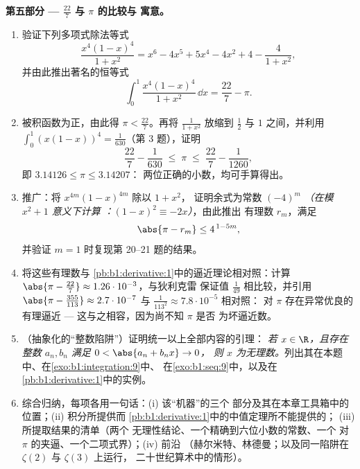 \begin{problem}
\medskip
\noindent\textbf{第五部分 --- $\frac{22}{7}$ 与 $\pi$ 的比较与
寓意。}
\begin{enumerate}[resume]
  \item 验证下列多项式除法等式
        \[
        \frac{x^4(1-x)^4}{1 + x^2}
        = x^6 - 4x^5 + 5x^4 - 4x^2 + 4 - \frac{4}{1 + x^2},
        \]
        并由此推出著名的恒等式
        \[
        \int_0^1 \frac{x^4 (1-x)^4}{1 + x^2}\,\dd x
        = \frac{22}{7} - \pi .
        \]
  \item 被积函数为正，由此得 $\pi <
        \frac{22}{7}$。再将 $\frac{1}{1+x^2}$ 放缩到
        $\frac12$ 与 $1$ 之间，并利用 $\int_0^1 (x(1-x))^4 =
        \frac{1}{630}$（第 3 题），证明
        \[
        \frac{22}{7} - \frac{1}{630} \;\leq\; \pi \;\leq\;
        \frac{22}{7} - \frac{1}{1260} ,
        \]
        即 $3.14126 \leq \pi \leq 3.14207$：
        两位正确的小数，均可手算得出。
  \item 推广：将 $x^{4m}(1-x)^{4m}$ 除以 $1 + x^2$，
        证明余式为常数 $(-4)^m$ \emph{（在模 $x^2 + 1$ 意义下计算
        ：$(1-x)^2 \equiv -2x$）}，由此推出
        有理数 $r_m$，满足
        \[
        \abs{\pi - r_m} \leq 4^{\,1 - 5m} ,
        \]
        并验证 $m = 1$ 时复现第 20--21 题的结果。
  \item 将这些有理数与
        \cref{pb:b1:derivative:1}中的逼近理论相对照：计算 $\abs{\pi -
        \frac{22}{7}} \approx 1.26\cdot10^{-3}$，与狄利克雷
        保证值 $\frac{1}{49}$ 相比较，并引用
        $\abs{\pi - \frac{355}{113}} \approx 2.7\cdot10^{-7}$
        与 $\frac{1}{113^2} \approx 7.8\cdot10^{-5}$ 相对照：
        对 $\pi$ 存在异常优良的有理逼近
        --- 这与之相容，因为尚不知 $\pi$ 是否
        为坏逼近数。
  \item （抽象化的“整数陷阱”）证明统一以上全部内容的引理：
        \emph{若 $x \in \R$，且存在
        整数 $a_n, b_n$ 满足 $0 < \abs{a_n + b_n x} \to 0$，
        则 $x$ 为无理数。}列出其在本题
        中、在\cref{exo:b1:integration:9}中、
        在\cref{exo:b1:seq:9}中，以及在\cref{pb:b1:derivative:1}中的实例。
  \item 综合归纳，每项各用一句话：(i) 该“机器”的三个
        部分及其在本章工具箱中的
        位置；(ii) 积分所提供而
        \cref{pb:b1:derivative:1}中的中值定理所不能提供的；
        (iii) 所提取结果的清单（两个
        无理性结论、一个精确到六位小数的常数、一个
        对 $\pi$ 的夹逼、一个二项式界）；(iv) 前沿
        （赫尔米特、林德曼；以及同一陷阱在
        $\zeta(2)$ 与 $\zeta(3)$ 上运行，
        二十世纪算术中的情形）。
\end{enumerate}
\end{problem}
